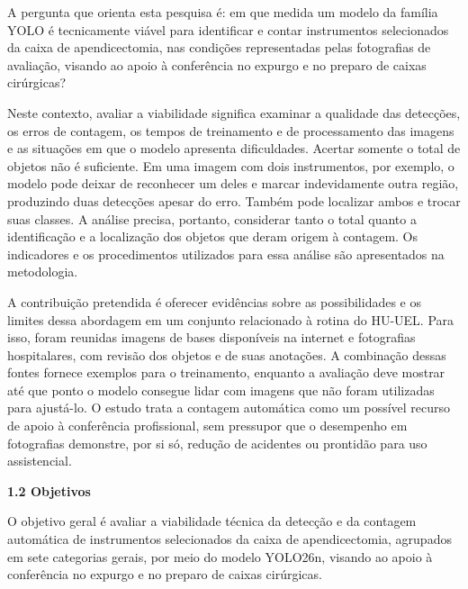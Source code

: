 A pergunta que orienta esta pesquisa é: em que medida um modelo da família YOLO é tecnicamente viável para identificar e contar instrumentos selecionados da caixa de apendicectomia, nas condições representadas pelas fotografias de avaliação, visando ao apoio à conferência no expurgo e no preparo de caixas cirúrgicas?

Neste contexto, avaliar a viabilidade significa examinar a qualidade das detecções, os erros de contagem, os tempos de treinamento e de processamento das imagens e as situações em que o modelo apresenta dificuldades. Acertar somente o total de objetos não é suficiente. Em uma imagem com dois instrumentos, por exemplo, o modelo pode deixar de reconhecer um deles e marcar indevidamente outra região, produzindo duas detecções apesar do erro. Também pode localizar ambos e trocar suas classes. A análise precisa, portanto, considerar tanto o total quanto a identificação e a localização dos objetos que deram origem à contagem. Os indicadores e os procedimentos utilizados para essa análise são apresentados na metodologia.

A contribuição pretendida é oferecer evidências sobre as possibilidades e os limites dessa abordagem em um conjunto relacionado à rotina do HU-UEL. Para isso, foram reunidas imagens de bases disponíveis na internet e fotografias hospitalares, com revisão dos objetos e de suas anotações. A combinação dessas fontes fornece exemplos para o treinamento, enquanto a avaliação deve mostrar até que ponto o modelo consegue lidar com imagens que não foram utilizadas para ajustá-lo. O estudo trata a contagem automática como um possível recurso de apoio à conferência profissional, sem pressupor que o desempenho em fotografias demonstre, por si só, redução de acidentes ou prontidão para uso assistencial.

\vspace{\baselineskip}
{}
\noindent\textbf{1.2 Objetivos}\par
\vspace{\baselineskip}

O objetivo geral é avaliar a viabilidade técnica da detecção e da contagem automática de instrumentos selecionados da caixa de apendicectomia, agrupados em sete categorias gerais, por meio do modelo YOLO26n, visando ao apoio à conferência no expurgo e no preparo de caixas cirúrgicas.

